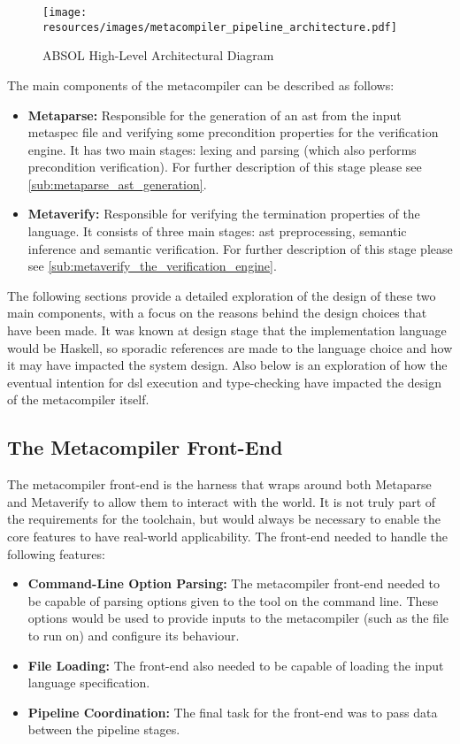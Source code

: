 \begin{figure}[!htb]
    \centering
    \texttt{[image: resources/images/metacompiler\_pipeline\_architecture.pdf]}
    \caption{ABSOL High-Level Architectural Diagram}
    \label{fig:absol_high_level_architectural_diagram}
\end{figure}

The main components of the metacompiler can be described as follows:
\begin{itemize}
    \item \textbf{Metaparse:} Responsible for the generation of an \gls{ast} from the input metaspec file and verifying some precondition properties for the verification engine. 
    It has two main stages: lexing and parsing (which also performs precondition verification). 
    For further description of this stage please see \autoref{sub:metaparse_ast_generation}.
    \item \textbf{Metaverify:} Responsible for verifying the termination properties of the language.
    It consists of three main stages: \gls{ast} preprocessing, semantic inference and semantic verification.
    For further description of this stage please see \autoref{sub:metaverify_the_verification_engine}.
\end{itemize}

The following sections provide a detailed exploration of the design of these two main components, with a focus on the reasons behind the design choices that have been made.
It was known at design stage that the implementation language would be Haskell, so sporadic references are made to the language choice and how it may have impacted the system design.
Also below is an exploration of how the eventual intention for \gls{dsl} execution and type-checking have impacted the design of the metacompiler itself. 

\subsection{The Metacompiler Front-End} %
\label{sub:the_metacompiler_front_end}
The metacompiler front-end is the harness that wraps around both Metaparse and Metaverify to allow them to interact with the world. 
It is not truly part of the requirements for the toolchain, but would always be necessary to enable the core features to have real-world applicability. 
The front-end needed to handle the following features:
\begin{itemize}
    \item \textbf{Command-Line Option Parsing:} The metacompiler front-end needed to be capable of parsing options given to the tool on the command line.
    These options would be used to provide inputs to the metacompiler (such as the file to run on) and configure its behaviour. 
    \item \textbf{File Loading:} The front-end also needed to be capable of loading the input language specification.
    \item \textbf{Pipeline Coordination:} The final task for the front-end was to pass data between the pipeline stages.
\end{itemize}

